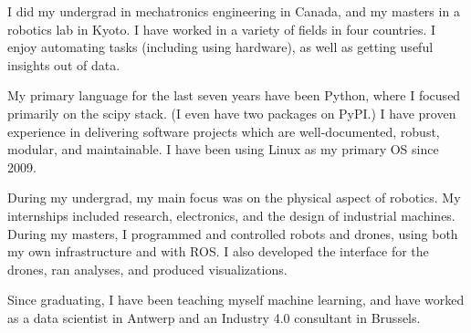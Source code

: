 I did my undergrad in mechatronics engineering in Canada, and my masters in a robotics lab in Kyoto. I have worked in a variety of fields in four countries. I enjoy automating tasks (including using hardware), as well as getting useful insights out of data.

My primary language for the last seven years have been Python, where I focused primarily on the scipy stack. (I even have two packages on PyPI.) I have proven experience in delivering software projects which are well-documented, robust, modular, and maintainable. I have been using Linux as my primary OS since 2009.

During my undergrad, my main focus was on the physical aspect of robotics. My internships included research, electronics, and the design of industrial machines. During my masters, I programmed and controlled robots and drones, using both my own infrastructure and with ROS. I also developed the interface for the drones, ran analyses, and produced visualizations.

Since graduating, I have been teaching myself machine learning, and have worked as a data scientist in Antwerp and an Industry 4.0 consultant in Brussels.
